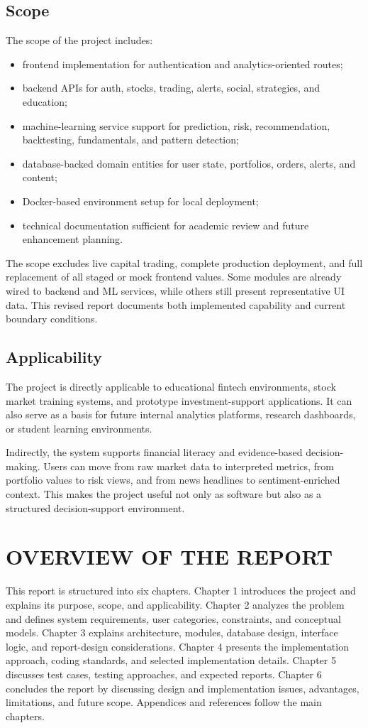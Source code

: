 \documentclass[12pt,a4paper]{report}
\begin{document}
\subsection{Scope}
The scope of the project includes:
\begin{itemize}
\item frontend implementation for authentication and analytics-oriented routes;
\item backend APIs for auth, stocks, trading, alerts, social, strategies, and education;
\item machine-learning service support for prediction, risk, recommendation, backtesting, fundamentals, and pattern detection;
\item database-backed domain entities for user state, portfolios, orders, alerts, and content;
\item Docker-based environment setup for local deployment;
\item technical documentation sufficient for academic review and future enhancement planning.
\end{itemize}

The scope excludes live capital trading, complete production deployment, and full replacement of all staged or mock frontend values. Some modules are already wired to backend and ML services, while others still present representative UI data. This revised report documents both implemented capability and current boundary conditions.

\subsection{Applicability}
The project is directly applicable to educational fintech environments, stock market training systems, and prototype investment-support applications. It can also serve as a basis for future internal analytics platforms, research dashboards, or student learning environments.

Indirectly, the system supports financial literacy and evidence-based decision-making. Users can move from raw market data to interpreted metrics, from portfolio values to risk views, and from news headlines to sentiment-enriched context. This makes the project useful not only as software but also as a structured decision-support environment.

\section{OVERVIEW OF THE REPORT}
This report is structured into six chapters. Chapter 1 introduces the project and explains its purpose, scope, and applicability. Chapter 2 analyzes the problem and defines system requirements, user categories, constraints, and conceptual models. Chapter 3 explains architecture, modules, database design, interface logic, and report-design considerations. Chapter 4 presents the implementation approach, coding standards, and selected implementation details. Chapter 5 discusses test cases, testing approaches, and expected reports. Chapter 6 concludes the report by discussing design and implementation issues, advantages, limitations, and future scope. Appendices and references follow the main chapters.
\end{document}
